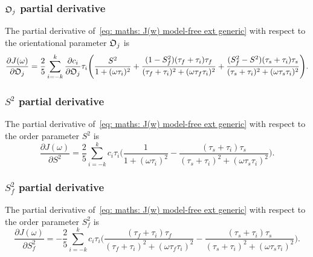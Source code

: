 \subsubsection{$\mathfrak{O}_j$ partial derivative}

The partial derivative of~\eqref{eq: maths: J(w) model-free ext generic} with respect to the orientational parameter $\mathfrak{O}_j$ is
\begin{equation}
    \frac{\partial J(\omega)}{\partial \mathfrak{O}_j} = \frac{2}{5} \sum_{i=-k}^k \frac{\partial c_i}{\partial \mathfrak{O}_j} \tau_i \Bigg(
        \frac{S^2}{1 + (\omega \tau_i)^2}
        + \frac{(1 - S^2_f)(\tau_f + \tau_i)\tau_f}{(\tau_f + \tau_i)^2 + (\omega \tau_f \tau_i)^2}
        + \frac{(S^2_f - S^2)(\tau_s + \tau_i)\tau_s}{(\tau_s + \tau_i)^2 + (\omega \tau_s \tau_i)^2}
    \Bigg).
\end{equation}



\subsubsection{$S^2$ partial derivative}

The partial derivative of~\eqref{eq: maths: J(w) model-free ext generic} with respect to the order parameter $S^2$ is
\begin{equation}
    \frac{\partial J(\omega)}{\partial S^2} = \frac{2}{5} \sum_{i=-k}^k c_i \tau_i \Bigg(
        \frac{1}{1 + (\omega \tau_i)^2}
        - \frac{(\tau_s + \tau_i)\tau_s}{(\tau_s + \tau_i)^2 + (\omega \tau_s \tau_i)^2}
    \Bigg).
\end{equation}



\subsubsection{$S^2_f$ partial derivative}

The partial derivative of~\eqref{eq: maths: J(w) model-free ext generic} with respect to the order parameter $S^2_f$ is
\begin{equation}
    \frac{\partial J(\omega)}{\partial S^2_f} = -\frac{2}{5} \sum_{i=-k}^k c_i \tau_i \Bigg(
        \frac{(\tau_f + \tau_i)\tau_f}{(\tau_f + \tau_i)^2 + (\omega \tau_f \tau_i)^2}
        - \frac{(\tau_s + \tau_i)\tau_s}{(\tau_s + \tau_i)^2 + (\omega \tau_s \tau_i)^2}
    \Bigg).
\end{equation}




